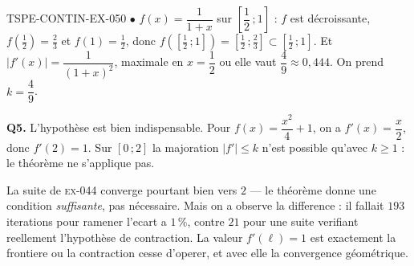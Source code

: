 \begin{corrige}{TSPE-CONTIN-EX-050}
$\bullet$ $f(x) = \dfrac{1}{1+x}$ sur $\left[\dfrac12\,;1\right]$ : $f$ est décroissante, $f\!\left(\tfrac12\right) = \tfrac23$ et $f(1) = \tfrac12$, donc $f\!\left(\left[\tfrac12\,;1\right]\right) = \left[\tfrac12\,;\tfrac23\right] \subset \left[\tfrac12\,;1\right]$. Et $\left|f'(x)\right| = \dfrac{1}{(1+x)^2}$, maximale en $x = \dfrac12$ ou elle vaut $\dfrac{4}{9} \approx 0{,}444$. On prend $k = \dfrac49$.

\textbf{Q5.} L'hypothèse est bien indispensable. Pour $f(x) = \dfrac{x^2}{4} + 1$, on a $f'(x) = \dfrac{x}{2}$, donc $f'(2) = 1$. Sur $[0\,;2]$ la majoration $\left|f'\right| \leq k$ n'est possible qu'avec $k \geq 1$ : le théorème ne s'applique pas.

La suite de \textsc{ex-044} converge pourtant bien vers $2$ — le théorème donne une condition \emph{suffisante}, pas nécessaire. Mais on a observe la difference : il fallait $193$ iterations pour ramener l'ecart a $1\,\%$, contre $21$ pour une suite verifiant reellement l'hypothèse de contraction. La valeur $f'(\ell) = 1$ est exactement la frontiere ou la contraction cesse d'operer, et avec elle la convergence géométrique.
\end{corrige}
